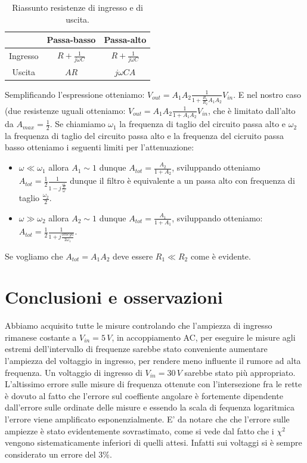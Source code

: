 \documentclass[10pt,a4paper]{article}
\begin{document}
\begin{table}[h]
\centering
\begin{tabular}{|c|c|c|}
\hline 
 & Passa-basso  & Passa-alto \\
\hline 
Ingresso & $R+\frac{1}{j \omega C}$ & $R+\frac{1}{j \omega C}$\\ 
Uscita & $AR$ & $j \omega C A$\\
\hline 
\end{tabular} 
\caption{Riassunto resistenze di ingresso e di uscita.}
\end{table}


Semplificando l'espressione otteniamo: $V_{out} = A_{1} A_{2} \frac{1}{1+\frac{R_1}{R_2} A_1 A_2} V_{in}$.
E nel nostro caso (due resistenze uguali otteniamo:
$V_{out} = A_{1} A_{2} \frac{1}{1+A_1 A_2} V_{in}$, che è limitato dall'alto da $A_{max} = \frac{1}{2}$.
Se chiamiamo $\omega_1$ la frequenza di taglio del circuito passa alto e $\omega_2$ la frequenza di taglio del circuito passa alto e la frequenza del cicruito passa basso otteniamo i seguenti limiti per l'attenuazione:

\begin{itemize}
\item $\omega \ll \omega_1$ allora $A_1 \sim 1$ dunque 
$A_{tot} = \frac{A_2}{1+A_2}$, sviluppando otteniamo 
$A_{tot} = \frac{1}{2} \frac{1}{1-j \frac{\frac{\omega_2}{2}}{\omega}}$ dunque il filtro è equivalente a un passa alto con frequenza di taglio $\frac{\omega_2}{2}$. 
\item $\omega \gg \omega_2$ allora $A_2 \sim 1$ dunque 
$A_{tot} = \frac{A_1}{1+A_1}$, sviluppando otteniamo:
$A_{tot} = \frac{1}{2} \frac{1}{1+j \frac{omega}{2 \omega_1}}$.
\end{itemize}

Se vogliamo che $A_{tot} = A_1 A_2$ deve essere $R_1 \ll R_2$ come è evidente.

\section{Conclusioni e osservazioni}
Abbiamo acquisito tutte le misure controlando che l'ampiezza di ingresso rimanese costante a $V_{in} = 5 \, V$, in accoppiamento AC, per eseguire le misure agli estremi dell'intervallo di frequenze sarebbe stato conveniente aumentare l'ampiezza del voltaggio in ingresso, per rendere meno influente il rumore ad alta frequenza. Un voltaggio di ingresso di $V_{in} = 30 \, V$ sarebbe stato più appropriato. L'altissimo errore sulle misure di frequenza ottenute con l'intersezione fra le rette è dovuto al fatto che l'errore sul coeffiente angolare è fortemente dipendente dall'errore sulle ordinate delle misure e essendo la scala di fequenza logaritmica l'errore viene amplificato esponenzialmente. E' da notare che che l'errore sulle ampiezze è stato evidentemente sovrastimato, come si vede dal fatto che i $\chi^2$ vengono sistematicamente inferiori di quelli attesi. Infatti sui voltaggi si è sempre considerato un errore del $3\%$.
\end{document}
